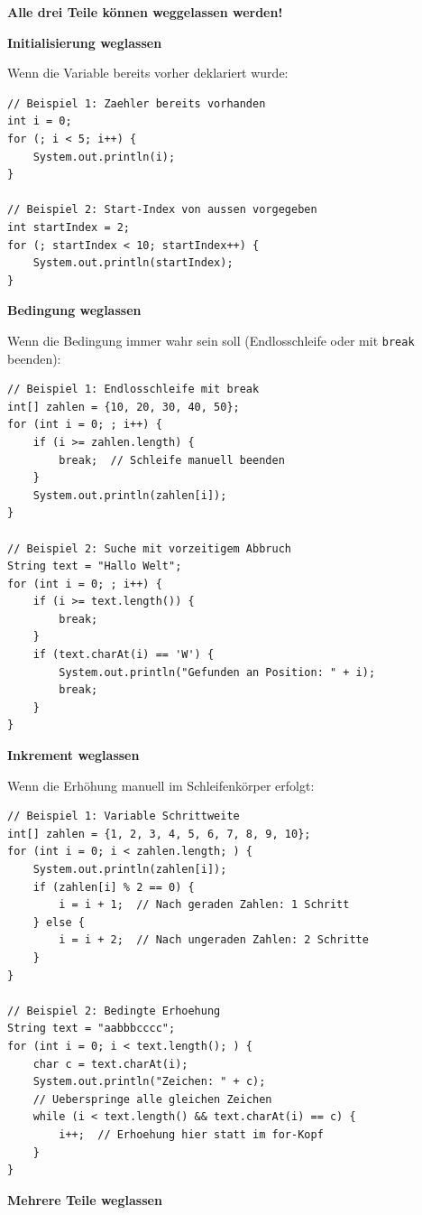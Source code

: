 \textbf{Alle drei Teile können weggelassen werden!}

\textbf{Initialisierung weglassen}

Wenn die Variable bereits vorher deklariert wurde:

\begin{lstlisting}
// Beispiel 1: Zaehler bereits vorhanden
int i = 0;
for (; i < 5; i++) {
    System.out.println(i);
}

// Beispiel 2: Start-Index von aussen vorgegeben
int startIndex = 2;
for (; startIndex < 10; startIndex++) {
    System.out.println(startIndex);
}
\end{lstlisting}

\textbf{Bedingung weglassen}

Wenn die Bedingung immer wahr sein soll (Endlosschleife oder mit \texttt{break} beenden):

\begin{lstlisting}
// Beispiel 1: Endlosschleife mit break
int[] zahlen = {10, 20, 30, 40, 50};
for (int i = 0; ; i++) {
    if (i >= zahlen.length) {
        break;  // Schleife manuell beenden
    }
    System.out.println(zahlen[i]);
}

// Beispiel 2: Suche mit vorzeitigem Abbruch
String text = "Hallo Welt";
for (int i = 0; ; i++) {
    if (i >= text.length()) {
        break;
    }
    if (text.charAt(i) == 'W') {
        System.out.println("Gefunden an Position: " + i);
        break;
    }
}
\end{lstlisting}

\textbf{Inkrement weglassen}

Wenn die Erhöhung manuell im Schleifenkörper erfolgt:

\begin{lstlisting}
// Beispiel 1: Variable Schrittweite
int[] zahlen = {1, 2, 3, 4, 5, 6, 7, 8, 9, 10};
for (int i = 0; i < zahlen.length; ) {
    System.out.println(zahlen[i]);
    if (zahlen[i] % 2 == 0) {
        i = i + 1;  // Nach geraden Zahlen: 1 Schritt
    } else {
        i = i + 2;  // Nach ungeraden Zahlen: 2 Schritte
    }
}

// Beispiel 2: Bedingte Erhoehung
String text = "aabbbcccc";
for (int i = 0; i < text.length(); ) {
    char c = text.charAt(i);
    System.out.println("Zeichen: " + c);
    // Ueberspringe alle gleichen Zeichen
    while (i < text.length() && text.charAt(i) == c) {
        i++;  // Erhoehung hier statt im for-Kopf
    }
}
\end{lstlisting}

\textbf{Mehrere Teile weglassen}

